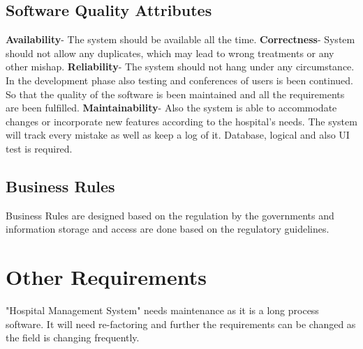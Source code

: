 \documentclass{scrreprt}
\begin{document}
\section{Software Quality Attributes}
\textbf{Availability}- The system should be available all the time.
\newline
\textbf{Correctness}- System should not allow any duplicates, which may lead to wrong treatments or any other mishap.
\newline
\textbf{Reliability}- The system should not hang under any circumstance.
\newline
In the development phase also testing and conferences of users is been continued. So that the quality of the software is been maintained and all the requirements are been fulfilled.
\newline
\textbf{Maintainability}- Also the system is able to accommodate changes or incorporate new features according to the hospital's needs.
\newline
The system will track every mistake as well as keep a log of it.
\newline
Database, logical and also UI test is required. 

\section{Business Rules}
Business Rules are designed based on the regulation by the governments and information storage and access are done based on the regulatory guidelines.


\chapter{Other Requirements}
"Hospital Management System" needs maintenance as it is a long process software. It will need re-factoring and further the requirements can be changed as the field is changing frequently.
\end{document}
